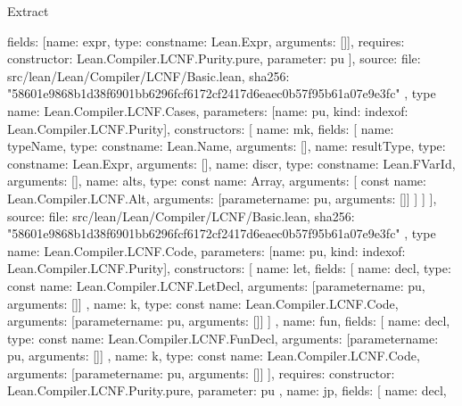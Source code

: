 \begin{lexlean}{Extract}
\begin{toolingmodule}
{{{          fields: [{name: expr, type: const{name: Lean.Expr, arguments: []}}],
          requires: {constructor: Lean.Compiler.LCNF.Purity.pure, parameter: pu}
        }
      ],
      source: {
        file: src/lean/Lean/Compiler/LCNF/Basic.lean,
        sha256: "58601e9868b1d38f6901bb6296fcf6172cf2417d6eaec0b57f95b61a07e9e3fc"
      }
    },
    type{
      name: Lean.Compiler.LCNF.Cases,
      parameters: [{name: pu, kind: index{of: Lean.Compiler.LCNF.Purity}}],
      constructors: [
        {
          name: mk,
          fields: [
            {name: typeName, type: const{name: Lean.Name, arguments: []}},
            {name: resultType, type: const{name: Lean.Expr, arguments: []}},
            {name: discr, type: const{name: Lean.FVarId, arguments: []}},
            {
              name: alts,
              type: const{
                name: Array,
                arguments: [
                  const{
                    name: Lean.Compiler.LCNF.Alt,
                    arguments: [parameter{name: pu, arguments: []}]
                  }
                ]
              }
            }
          ]
        }
      ],
      source: {
        file: src/lean/Lean/Compiler/LCNF/Basic.lean,
        sha256: "58601e9868b1d38f6901bb6296fcf6172cf2417d6eaec0b57f95b61a07e9e3fc"
      }
    },
    type{
      name: Lean.Compiler.LCNF.Code,
      parameters: [{name: pu, kind: index{of: Lean.Compiler.LCNF.Purity}}],
      constructors: [
        {
          name: let,
          fields: [
            {
              name: decl,
              type: const{
                name: Lean.Compiler.LCNF.LetDecl,
                arguments: [parameter{name: pu, arguments: []}]
              }
            },
            {
              name: k,
              type: const{
                name: Lean.Compiler.LCNF.Code,
                arguments: [parameter{name: pu, arguments: []}]
              }
            }
          ]
        },
        {
          name: fun,
          fields: [
            {
              name: decl,
              type: const{
                name: Lean.Compiler.LCNF.FunDecl,
                arguments: [parameter{name: pu, arguments: []}]
              }
            },
            {
              name: k,
              type: const{
                name: Lean.Compiler.LCNF.Code,
                arguments: [parameter{name: pu, arguments: []}]
              }
            }
          ],
          requires: {constructor: Lean.Compiler.LCNF.Purity.pure, parameter: pu}
        },
        {
          name: jp,
          fields: [
            {
              name: decl,
}}}}
\end{toolingmodule}
\end{lexlean}
